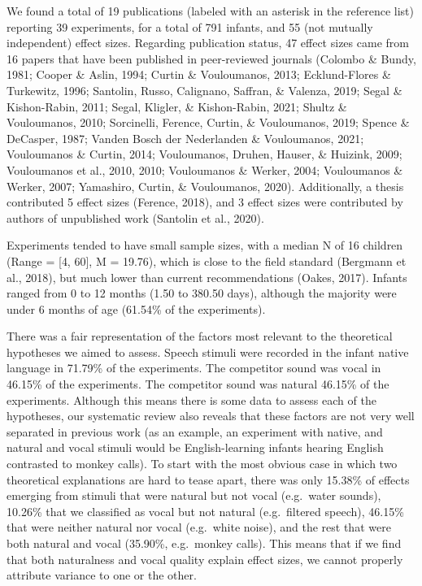 \documentclass[
  man,mask,floatsintext]{apa6}
\begin{document}
We found a total of 19 publications (labeled with an asterisk in the reference list) reporting 39 experiments, for a total of 791 infants, and 55 (not mutually independent) effect sizes. Regarding publication status, 47 effect sizes came from 16 papers that have been published in peer-reviewed journals (Colombo \& Bundy, 1981; Cooper \& Aslin, 1994; Curtin \& Vouloumanos, 2013; Ecklund-Flores \& Turkewitz, 1996; Santolin, Russo, Calignano, Saffran, \& Valenza, 2019; Segal \& Kishon-Rabin, 2011; Segal, Kligler, \& Kishon-Rabin, 2021; Shultz \& Vouloumanos, 2010; Sorcinelli, Ference, Curtin, \& Vouloumanos, 2019; Spence \& DeCasper, 1987; Vanden Bosch der Nederlanden \& Vouloumanos, 2021; Vouloumanos \& Curtin, 2014; Vouloumanos, Druhen, Hauser, \& Huizink, 2009; Vouloumanos et al., 2010, 2010; Vouloumanos \& Werker, 2004; Vouloumanos \& Werker, 2007; Yamashiro, Curtin, \& Vouloumanos, 2020). Additionally, a thesis contributed 5 effect sizes (Ference, 2018), and 3 effect sizes were contributed by authors of unpublished work (Santolin et al., 2020).

Experiments tended to have small sample sizes, with a median N of 16 children (Range = {[}4, 60{]}, M = 19.76), which is close to the field standard (Bergmann et al., 2018), but much lower than current recommendations (Oakes, 2017). Infants ranged from 0 to 12 months (1.50 to 380.50 days), although the majority were under 6 months of age (61.54\% of the experiments).

There was a fair representation of the factors most relevant to the theoretical hypotheses we aimed to assess. Speech stimuli were recorded in the infant native language in 71.79\% of the experiments.
The competitor sound was vocal in 46.15\% of the experiments. The competitor sound was natural 46.15\% of the experiments. Although this means there is some data to assess each of the hypotheses, our systematic review also reveals that these factors are not very well separated in previous work (as an example, an experiment with native, and natural and vocal stimuli would be English-learning infants hearing English contrasted to monkey calls). To start with the most obvious case in which two theoretical explanations are hard to tease apart, there was only 15.38\% of effects emerging from stimuli that were natural but not vocal (e.g.~water sounds), 10.26\% that we classified as vocal but not natural (e.g.~filtered speech), 46.15\% that were neither natural nor vocal (e.g.~white noise), and the rest that were both natural and vocal (35.90\%, e.g.~monkey calls). This means that if we find that both naturalness and vocal quality explain effect sizes, we cannot properly attribute variance to one or the other.
\end{document}
